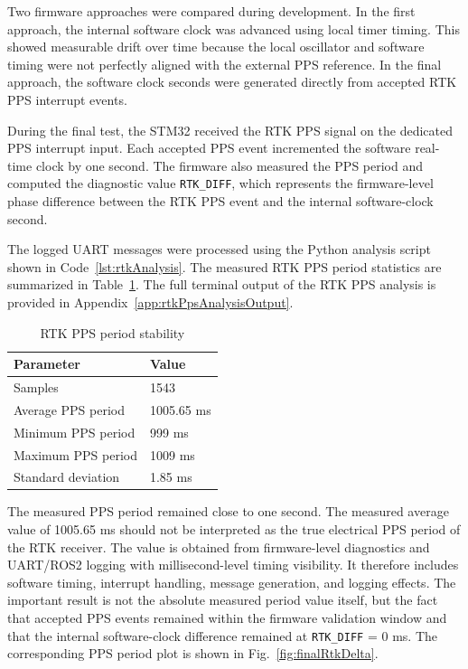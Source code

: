 Two firmware approaches were compared during development. In the first approach, the internal software clock was advanced using local timer timing. This showed measurable drift over time because the local oscillator and software timing were not perfectly aligned with the external PPS reference. In the final approach, the software clock seconds were generated directly from accepted RTK PPS interrupt events.

During the final test, the STM32 received the RTK PPS signal on the dedicated PPS interrupt input. Each accepted PPS event incremented the software real-time clock by one second. The firmware also measured the PPS period and computed the diagnostic value \texttt{RTK\_DIFF}, which represents the firmware-level phase difference between the RTK PPS event and the internal software-clock second.

The logged UART messages were processed using the Python analysis script shown in Code~\ref{lst:rtkAnalysis}. The measured RTK PPS period statistics are summarized in Table~\ref{tab:rtkPpsPeriod}. The full terminal output of the RTK PPS analysis is provided in Appendix~\ref{app:rtkPpsAnalysisOutput}.

\begin{table}[H]
\centering
\caption{RTK PPS period stability}
\label{tab:rtkPpsPeriod}
\begin{tabular}{|l|l|}
\hline
\textbf{Parameter} & \textbf{Value} \\
\hline
Samples & 1543 \\
Average PPS period & 1005.65 ms \\
Minimum PPS period & 999 ms \\
Maximum PPS period & 1009 ms \\
Standard deviation & 1.85 ms \\
\hline
\end{tabular}
\end{table}

The measured PPS period remained close to one second. The measured average value of 1005.65 ms should not be interpreted as the true electrical PPS period of the RTK receiver. The value is obtained from firmware-level diagnostics and UART/ROS2 logging with millisecond-level timing visibility. It therefore includes software timing, interrupt handling, message generation, and logging effects. The important result is not the absolute measured period value itself, but the fact that accepted PPS events remained within the firmware validation window and that the internal software-clock difference remained at \texttt{RTK\_DIFF} = 0 ms. The corresponding PPS period plot is shown in Fig.~\ref{fig:finalRtkDelta}.


